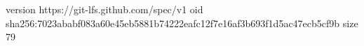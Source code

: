 version https://git-lfs.github.com/spec/v1
oid sha256:7023ababf083a60e45eb5881b74222eafc12f7e16af3b693f1d5ac47ecb5cf9b
size 79
